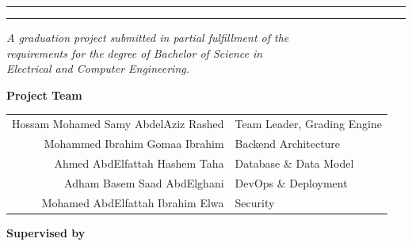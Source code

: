 \begin{titlepage}
\centering
\thispagestyle{empty}

\vspace*{0.6cm}
{\sffamily\large \bookUniversity\par}
{\sffamily\normalsize \bookFaculty\par}
{\sffamily\normalsize \bookDept\par}

\vfill

{\color{apexblue}\rule{\linewidth}{1.2pt}}
\vspace{0.5cm}

{\sffamily\bfseries\LARGE\color{apexblue} \bookTitle\par}

\vspace{0.5cm}
{\color{apexblue}\rule{\linewidth}{1.2pt}}

\vspace{0.8cm}
{\itshape A graduation project submitted in partial fulfillment of the\\
requirements for the degree of Bachelor of Science in\\
Electrical and Computer Engineering.\par}

\vfill

{\sffamily\bfseries\large Project Team\par}
\vspace{0.2cm}
\begin{tabular}{rl}
Hossam Mohamed Samy AbdelAziz Rashed & Team Leader, Grading Engine\\
Mohammed Ibrahim Gomaa Ibrahim & Backend Architecture\\
Ahmed AbdElfattah Hashem Taha & Database \& Data Model\\
Adham Basem Saad AbdElghani & DevOps \& Deployment\\
Mohamed AbdElfattah Ibrahim Elwa & Security\\
\end{tabular}

\vspace{0.8cm}
{\sffamily\bfseries Supervised by\par}
\vspace{0.1cm}
{\large \bookSupervisor\par}

\vfill
{\sffamily \bookYear\par}

\end{titlepage}
\cleardoublepage
